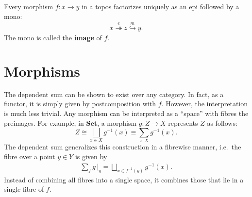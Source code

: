     \begin{property}
        Every morphism $f:x\rightarrow y$ in a topos factorizes uniquely as an epi followed by a mono:
        \begin{gather}
            x\overset{e}{\twoheadrightarrow}z\overset{m}{\hookrightarrow}y.
        \end{gather}
        The mono is called the \textbf{image} of $f$.
    \end{property}

\section{Morphisms}

    \begin{remark}
        The dependent sum can be shown to exist over any category. In fact, as a functor, it is simply given by postcomposition with $f$. However, the interpretation is much less trivial. Any morphism can be interpreted as a ``space'' with fibres the preimages. For example, in $\mathbf{Set}$, a morphism $g:Z\rightarrow X$ represents $Z$ as follows: \[Z\cong\bigsqcup_{x\in X}g^{-1}(x)\equiv\sum_{x:X}g^{-1}(x).\] The dependent sum generalizes this construction in a fibrewise manner, i.e.~the fibre over a point $y\in Y$ is given by
        \begin{gather}
            \sum_fg\,\Big|_y = \bigsqcup_{x\in f^{-1}(y)}g^{-1}(x).
        \end{gather}
        Instead of combining all fibres into a single space, it combines those that lie in a single fibre of $f$.
    \end{remark}

